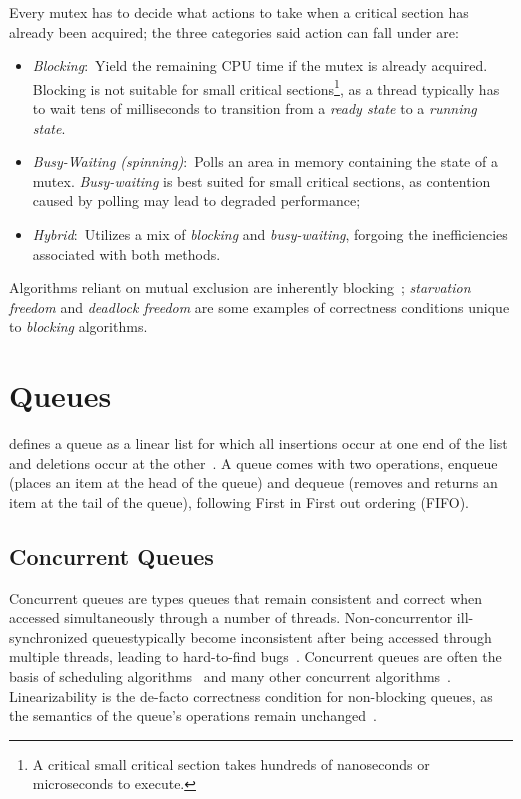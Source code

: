 Every mutex has to decide what actions to take when a critical section has
already been acquired; the three categories said action can fall under are: 
\begin{itemize}
\item \emph{Blocking}:~Yield the remaining CPU time if the mutex is already acquired.
Blocking is not suitable for small critical sections\footnote{A critical
small critical section takes hundreds of nanoseconds or microseconds to
execute.}, as a thread typically has to wait tens of milliseconds to transition
from a \emph{ready state} to a \emph{running state}.
\item \emph{Busy-Waiting (spinning)}:~Polls an area in memory containing the
state of a mutex. \emph{Busy-waiting} is best suited for small critical sections, as
contention caused by polling may lead to degraded performance;
\item \emph{Hybrid}:~Utilizes a mix of \emph{blocking} and \emph{busy-waiting},
forgoing the inefficiencies associated with both methods.
\end{itemize}

Algorithms reliant on mutual exclusion are inherently
blocking~\citep[Section~3.8]{herlihy2020art}; \emph{starvation freedom} and
\emph{deadlock freedom} are some examples of correctness conditions unique to
\emph{blocking} algorithms.


\section{Queues}
\citeauthor{knuth1968art} defines a queue as a linear list for which all
insertions occur at one end of the list and deletions occur at the
other~\citep{knuth1968art}. A queue comes with two operations, enqueue (places
an item at the head of the queue) and dequeue (removes and returns an item at
the tail of the queue), following First in First out ordering (FIFO).

\subsection{Concurrent Queues}
Concurrent queues are types queues that remain consistent and correct when
accessed simultaneously through a number of threads. Non-concurrent\textemdash or
ill-synchronized queues\textemdash typically become inconsistent after being
accessed through multiple threads, leading
to hard-to-find bugs~\citep{yahav2003automatically}. Concurrent queues are often the basis of scheduling
algorithms~\citep{debattista2002high} and many other concurrent
algorithms~\citep{yahav2003automatically}. Linearizability is the de-facto correctness condition
for non-blocking queues, as the semantics of the queue's
operations remain unchanged~\citep{mellor1987concurrent, valois1995datastructures}.

